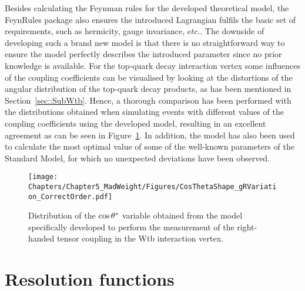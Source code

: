 Besides calculating the Feynman rules for the developed theoretical model, the FeynRules package also ensures the introduced Lagrangian fulfils the basic set of requirements, such as hermicity, gauge invariance, $etc. $.
The downside of developing such a brand new model is that there is no straightforward way to ensure the model perfectly describes the introduced parameter since no prior knowledge is available.
For the top-quark decay interaction vertex some influences of the coupling coefficients can be visualised by looking at the distortions of the angular distribution of the top-quark decay products, as has been mentioned in Section~\ref{sec::SubWtb}. 
Hence, a thorough comparison has been performed with the distributions obtained when simulating events with different values of the coupling coefficients using the developed model, resulting in an excellent agreement as can be seen in Figure~\ref{fig::ModelTest}.
In addition, the model has also been used to calculate the most optimal value of some of the well-known parameters of the Standard Model, for which no unexpected deviations have been observed. 

\begin{figure}[h!t]
 \centering
 \texttt{[image: Chapters/Chapter5\_MadWeight/Figures/CosThetaShape\_gRVariation\_CorrectOrder.pdf]}
 \caption{Distribution of the $\cos \theta^{*}$ variable obtained from the model specifically developed to perform the measurement of the right-handed tensor coupling in the Wtb interaction vertex.} \label{fig::ModelTest}
\end{figure}


\section{Resolution functions} \label{sec::TF}


